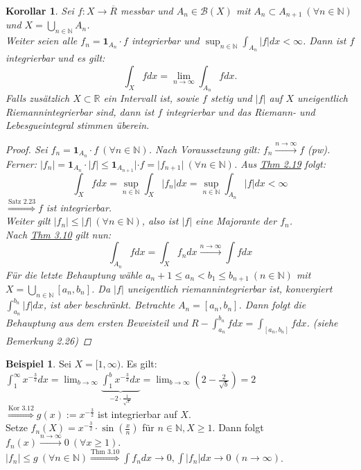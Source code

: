 \documentclass[a4paper]{scrreprt}
\newcommand{\doubleOne}{\textbf{1}}
\newcommand{\R}{\mathbb{R}}
\newcommand{\N}{\mathbb{N}}
\newcommand{\Borel}{\mathcal{B}}
\newcommand{\toInf}{\rightarrow \infty}
\newcommand{\limToInf}[1]{\lim_{#1 \toInf}}
\newcommand{\jlabel}[1]{\label{j_#1}}
\newcommand{\jshortlink}[1]{\jhyperref{#1}{\text{#1}}}
\newcommand{\jhyperref}[2]{\hyperref[j_#1]{#2}}
\newcommand{\jlink}[1]{\jhyperref{#1}{#1}}
\newcommand{\jabb}[3]{ #1: #2 \rightarrow #3 }
\theoremstyle{plain}
\newtheorem{kor}[thm]{Korollar}
\theoremstyle{definition}
\newtheorem*{expl*}{Beispiel}
\begin{document}
{{{{\begin{kor}
\jlabel{Kor 3.12}
    Sei $\jabb{f}{X}{\overline{R}}$ messbar und $A_n \in \Borel(X)$ mit $A_n \subset A_{n+1} \ (\forall n\in\N)$ und $X = \bigcup_{n\in\N} A_n$.\\
    Weiter seien alle $f_n = \doubleOne_{A_n} \cdot f$ integrierbar und $\sup_{n\in\N} \int_{A_n} |f|dx < \infty$. Dann ist $f$ integrierbar und es gilt:
    \begin{displaymath}
        \int_{X}fdx = \limToInf{n} \int_{A_n} f dx.
    \end{displaymath}
    Falls zusätzlich $X\subset \R$ ein Intervall ist, sowie $f$ stetig und $|f|$ auf $X$ uneigentlich Riemannintegrierbar sind, dann ist $f$ integrierbar und das Riemann- und Lebesgueintegral stimmen überein.
    \begin{proof}
        Sei $f_n = \doubleOne_{A_n}\cdot f \ (\forall n\in\N)$. Nach Voraussetzung gilt: $f_n \xrightarrow{n\rightarrow \infty} f$ (pw). Ferner: $|f_n| = \doubleOne_{A_n}\cdot |f| \le \doubleOne_{A_{n+1}}|\cdot f = |f_{n+1}| \ (\forall n\in\N)$. Aus \jlink{Thm 2.19} folgt: 
        \begin{displaymath}
            \int_X f dx = \sup_{n\in\N} \int_X |f_n| dx = \sup_{n \in\N} \int_{A_n} |f| dx < \infty
        \end{displaymath}
        $\overset{\jshortlink{Satz 2.23}}{\Rightarrow} f$ ist integrierbar.\\
        Weiter gilt $|f_n| \le |f| \ (\forall n\in\N)$, also ist $|f|$ eine Majorante der $f_n$.\\
        Nach \jlink{Thm 3.10} gilt nun:
        \begin{displaymath}
            \int_{A_n} f dx = \int_X f_n dx \xrightarrow{n \rightarrow \infty} \int f dx
        \end{displaymath}
        Für die letzte Behauptung wähle $a_n+1 \le a_n < b_1 \le b_{n+1} \ (n \in\N)$ mit $X = \bigcup_{n\in\N} [a_n, b_n]$. Da $|f|$ uneigentlich riemannintegrierbar ist, konvergiert $\int_{a_n}^{b_n} |f| dx$, ist aber beschränkt. Betrachte $A_n = [a_n, b_n]$. Dann folgt die Behauptung aus dem ersten Beweisteil und $R-\int_{a_n}^{b_n} f dx = \int_{[a_n,b_n]} f dx$. (siehe Bemerkung 2.26)
    \end{proof}
\end{kor}

\begin{expl*}
    Sei $X = [1,\infty)$. Es gilt:\\
    $\int_1^\infty x^{-\frac{3}{2}}dx = \limToInf{b} \underbrace{\int_1^b x^{-\frac{3}{2}} dx}_{-2 \cdot \frac{1}{\sqrt{x}}} = \limToInf{b} \left( 2- \frac{2}{\sqrt{b}}\right) = 2$\\
    $\overset{\text{Kor 3.12}}{\Rightarrow} g(x) := x^{-\frac{3}{2}}$ ist integrierbar auf $X$.\\
    Setze $f_n(X) = x^{-\frac{3}{2}} \cdot \sin(\frac{x}{n})$ für $n\in\N, X \ge 1$. Dann folgt $f_n(x) \xrightarrow{n\rightarrow\infty} 0 \ (\forall x \ge 1)$. $|f_n| \le g \ (\forall n\in\N) \overset{\text{Thm 3.10}}{\Rightarrow} \int f_n dx \rightarrow 0, \int |f_n| dx \rightarrow 0 \ (n\rightarrow\infty)$.
\end{expl*}


}}}}
\end{document}
